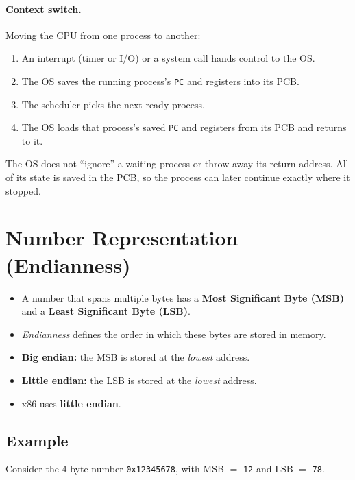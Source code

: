 \documentclass{article}
\newcommand{\reg}[1]{\texttt{#1}}
\begin{document}
\paragraph{Context switch.} Moving the CPU from one process to another:
\begin{enumerate}
	\item An interrupt (timer or I/O) or a system call hands control to the OS.
	\item The OS saves the running process's \reg{PC} and registers into its PCB.
	\item The scheduler picks the next ready process.
	\item The OS loads that process's saved \reg{PC} and registers from its PCB and returns to it.
\end{enumerate}

\begin{pitfall}
	The OS does not ``ignore'' a waiting process or throw away its return address. All of its state is saved in the PCB, so the process can later continue exactly where it stopped.
\end{pitfall}

\section{Number Representation (Endianness)}

\begin{itemize}
	\item A number that spans multiple bytes has a \textbf{Most Significant Byte (MSB)} and a \textbf{Least Significant Byte (LSB)}.
	\item \emph{Endianness} defines the order in which these bytes are stored in memory.
	\item \textbf{Big endian:} the MSB is stored at the \emph{lowest} address.
	\item \textbf{Little endian:} the LSB is stored at the \emph{lowest} address.
	\item x86 uses \textbf{little endian}.
\end{itemize}

\subsection{Example}
Consider the 4-byte number \texttt{0x12345678}, with MSB $=$ \texttt{12} and LSB $=$ \texttt{78}.
\end{document}
